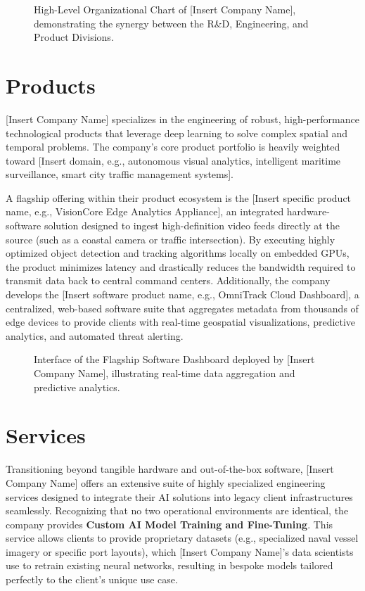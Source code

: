 \begin{figure}[htb]
\centering
	\caption{High-Level Organizational Chart of [Insert Company Name], demonstrating the synergy between the R\&D, Engineering, and Product Divisions.}
	\label{fig:org_chart}
\end{figure}

\section{Products}
[Insert Company Name] specializes in the engineering of robust, high-performance technological products that leverage deep learning to solve complex spatial and temporal problems. The company's core product portfolio is heavily weighted toward [Insert domain, e.g., autonomous visual analytics, intelligent maritime surveillance, smart city traffic management systems]. 

A flagship offering within their product ecosystem is the [Insert specific product name, e.g., VisionCore Edge Analytics Appliance], an integrated hardware-software solution designed to ingest high-definition video feeds directly at the source (such as a coastal camera or traffic intersection). By executing highly optimized object detection and tracking algorithms locally on embedded GPUs, the product minimizes latency and drastically reduces the bandwidth required to transmit data back to central command centers. Additionally, the company develops the [Insert software product name, e.g., OmniTrack Cloud Dashboard], a centralized, web-based software suite that aggregates metadata from thousands of edge devices to provide clients with real-time geospatial visualizations, predictive analytics, and automated threat alerting.

\begin{figure}[htb]
\centering
	\caption{Interface of the Flagship Software Dashboard deployed by [Insert Company Name], illustrating real-time data aggregation and predictive analytics.}
	\label{fig:product_showcase}
\end{figure}

\section{Services}
Transitioning beyond tangible hardware and out-of-the-box software, [Insert Company Name] offers an extensive suite of highly specialized engineering services designed to integrate their AI solutions into legacy client infrastructures seamlessly. Recognizing that no two operational environments are identical, the company provides \textbf{Custom AI Model Training and Fine-Tuning}. This service allows clients to provide proprietary datasets (e.g., specialized naval vessel imagery or specific port layouts), which [Insert Company Name]'s data scientists use to retrain existing neural networks, resulting in bespoke models tailored perfectly to the client's unique use case.

